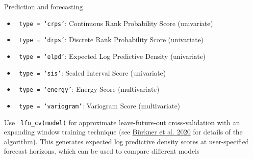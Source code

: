 \documentclass[final,9pt,fleqn]{beamer}\usepackage[]{graphicx}\usepackage[]{xcolor}
\begin{document}
\begin{frame}[fragile]
\begin{columns}
\begin{column}{0.3\paperwidth}
\begin{block}{{\fontsize{21}{21} \selectfont \color{BrickRed} Prediction and forecasting}}
\begin{itemize}
\item \texttt{\color{Orchid} type = 'crps'}: Continuous Rank Probability Score (univariate)
\item \texttt{\color{Orchid} type = 'drps'}: Discrete Rank Probability Score (univariate)
\item \texttt{\color{Orchid} type = 'elpd'}: Expected Log Predictive Density (univariate)
\item \texttt{\color{Orchid} type = 'sis'}: Scaled Interval Score (univariate)
\item \texttt{\color{Orchid} type = 'energy'}: Energy Score (multivariate)
\item \texttt{\color{Orchid} type = 'variogram'}: Variogram Score (multivariate)
\end{itemize}

\medskip
Use \texttt{\color{Orchid} lfo\_cv(model)} for approximate leave-future-out cross-validation with an expanding window training technique (see \href{https://www.tandfonline.com/doi/full/10.1080/00949655.2020.1783262}{Bürkner et al. 2020} for details of the algorithm). This generates expected log predictive density scores at user-specified forecast horizons, which can be used to compare different models

\end{block}
\end{column}

\end{columns}
\end{frame}
\end{document}
